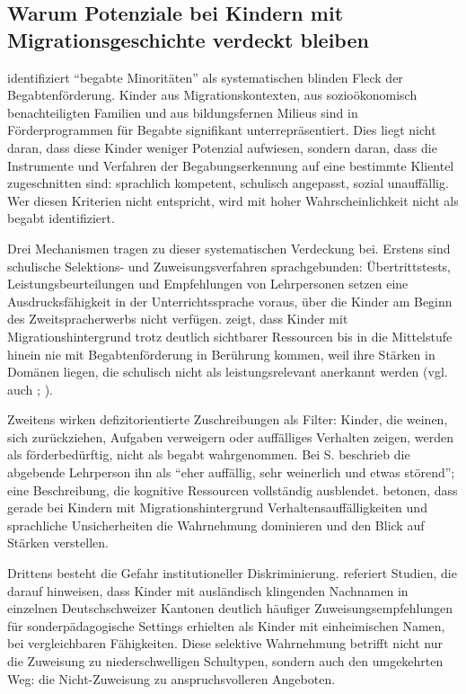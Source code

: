 \documentclass[ngerman, a4paper]{article}
\begin{document}
\subsection{Warum Potenziale bei Kindern mit Migrationsgeschichte verdeckt bleiben}

\textcite{stamm2021fehlenderblick} identifiziert \enquote{begabte Minoritäten} als systematischen blinden Fleck der
Begabtenförderung. Kinder aus Migrationskontexten, aus sozioökonomisch benachteiligten
Familien und aus bildungsfernen Milieus sind in Förderprogrammen für Begabte signifikant
unterrepräsentiert. Dies liegt nicht daran, dass diese Kinder weniger Potenzial aufwiesen,
sondern daran, dass die Instrumente und Verfahren der Begabungserkennung auf eine
bestimmte Klientel zugeschnitten sind: sprachlich kompetent, schulisch angepasst,
sozial unauffällig. Wer diesen Kriterien nicht
entspricht, wird mit hoher Wahrscheinlichkeit nicht als begabt identifiziert.

Drei Mechanismen tragen zu dieser systematischen Verdeckung bei. Erstens sind
schulische Selektions- und Zuweisungsverfahren sprachgebunden: Übertrittstests,
Leistungsbeurteilungen und Empfehlungen von Lehrpersonen setzen eine
Ausdrucksfähigkeit in der Unterrichtssprache voraus, über die Kinder am Beginn des
Zweitspracherwerbs nicht verfügen. \textcite{kellerkoller2021hellekoepfe} zeigt, dass Kinder mit
Migrationshintergrund trotz deutlich sichtbarer Ressourcen bis in die Mittelstufe hinein
nie mit Begabtenförderung in Berührung kommen, weil ihre Stärken in Domänen liegen,
die schulisch nicht als leistungsrelevant anerkannt werden
(vgl. auch \textcite{kellerkoller2009begabte}; \textcite{kellerkoller2011erkennen}).

Zweitens wirken defizitorientierte Zuschreibungen als Filter: Kinder, die weinen,
sich zurückziehen, Aufgaben verweigern oder auffälliges Verhalten zeigen, werden
als förderbedürftig, nicht als begabt wahrgenommen. Bei S. beschrieb die abgebende
Lehrperson ihn als \enquote{eher auffällig, sehr weinerlich und etwas störend}; eine
Beschreibung, die kognitive Ressourcen vollständig ausblendet. \textcite{reutlinger2015hochbegabung}
betonen, dass gerade bei Kindern mit Migrationshintergrund
Verhaltensauffälligkeiten und sprachliche Unsicherheiten die Wahrnehmung dominieren
und den Blick auf Stärken verstellen.

Drittens besteht die Gefahr institutioneller Diskriminierung. \textcite{kappus2010migration} referiert Studien,
die darauf hinweisen, dass Kinder mit ausländisch klingenden Nachnamen in einzelnen
Deutschschweizer Kantonen deutlich häufiger Zuweisungsempfehlungen für
sonderpädagogische Settings erhielten als Kinder mit einheimischen Namen, bei
vergleichbaren Fähigkeiten. Diese selektive Wahrnehmung betrifft nicht nur die
Zuweisung zu niederschwelligen Schultypen, sondern auch den umgekehrten Weg: die
Nicht-Zuweisung zu anspruchsvolleren Angeboten.
\end{document}
